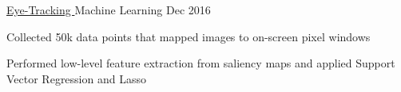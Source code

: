 \begin{cventries}

	\projectwithsubtitle
		{\href{https://github.com/sherl0ck-/eye_track}{Eye-Tracking }}
		{Machine Learning}
		{Dec 2016}
		{
			\begin{cvitems}
				\item {Collected 50k data points that mapped images to on-screen pixel windows}
				\item{Performed low-level feature extraction from saliency maps and applied Support Vector Regression and Lasso}
			\end{cvitems}
		}

\end{cventries}
